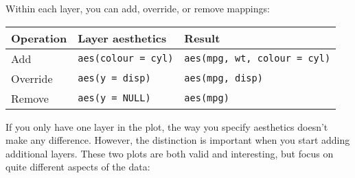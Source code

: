 \begin{Shaded}
\begin{Highlighting}[]
 \StringTok{ }
\StringTok{  }\NormalTok{()}
\StringTok{ }
\StringTok{  }\NormalTok{(}\NormalTok{(} 
\StringTok{ }
\StringTok{  }\NormalTok{(}\NormalTok{(}  
\StringTok{ }
\StringTok{  }\NormalTok{(} 
\end{Highlighting}
\end{Shaded}

Within each layer, you can add, override, or remove mappings:

\begin{longtable}[c]{@{}lll@{}}
\toprule
Operation & Layer aesthetics & Result\tabularnewline
\midrule
\endhead
Add & \texttt{aes(colour\ =\ cyl)} &
\texttt{aes(mpg,\ wt,\ colour\ =\ cyl)}\tabularnewline
Override & \texttt{aes(y\ =\ disp)} &
\texttt{aes(mpg,\ disp)}\tabularnewline
Remove & \texttt{aes(y\ =\ NULL)} & \texttt{aes(mpg)}\tabularnewline
\bottomrule
\end{longtable}

If you only have one layer in the plot, the way you specify aesthetics
doesn't make any difference. However, the distinction is important when
you start adding additional layers. These two plots are both valid and
interesting, but focus on quite different aspects of the data:

\begin{Shaded}
\begin{Highlighting}[]
 \StringTok{ }
\StringTok{  }\NormalTok{() +}\StringTok{ }
\StringTok{  }\NormalTok{(} \NormalTok{, } \NormalTok{) +}
\StringTok{  }\NormalTok{(} \NormalTok{)}

\StringTok{ }
\StringTok{  }\NormalTok{(}\NormalTok{(} \StringTok{ }
\StringTok{  }\NormalTok{(} \NormalTok{, } \NormalTok{) +}\StringTok{ }
\StringTok{  }\NormalTok{(} \NormalTok{)}
\end{Highlighting}
\end{Shaded}

